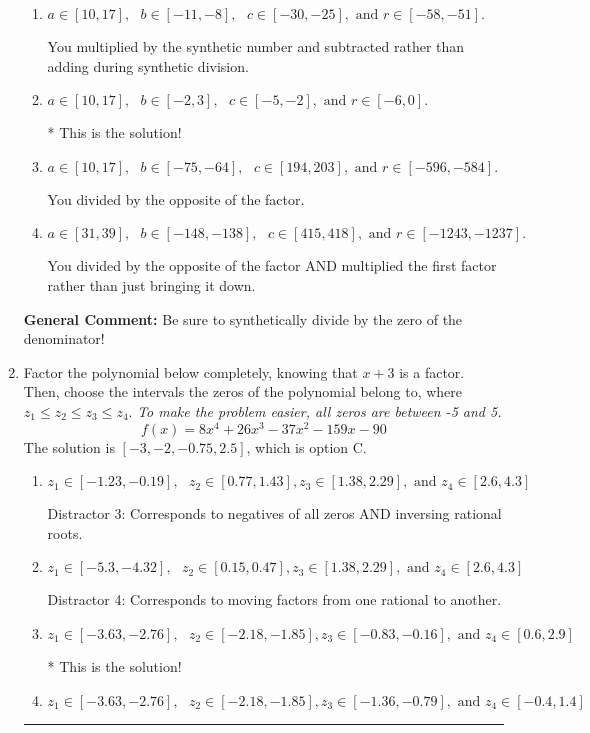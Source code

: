\documentclass{extbook}[14pt]
\newcommand{\litem}[1]{\item #1

\rule{\textwidth}{0.4pt}}
\begin{document}
\begin{enumerate}
{\begin{enumerate}[label=\Alph*.]
 You multiplied by the synthetic number rather than bringing the first factor down.
\item \( a \in [10, 17], \text{   } b \in [-11, -8], \text{   } c \in [-30, -25], \text{   and   } r \in [-58, -51]. \)

 You multiplied by the synthetic number and subtracted rather than adding during synthetic division.
\item \( a \in [10, 17], \text{   } b \in [-2, 3], \text{   } c \in [-5, -2], \text{   and   } r \in [-6, 0]. \)

* This is the solution!
\item \( a \in [10, 17], \text{   } b \in [-75, -64], \text{   } c \in [194, 203], \text{   and   } r \in [-596, -584]. \)

 You divided by the opposite of the factor.
\item \( a \in [31, 39], \text{   } b \in [-148, -138], \text{   } c \in [415, 418], \text{   and   } r \in [-1243, -1237]. \)

 You divided by the opposite of the factor AND multiplied the first factor rather than just bringing it down.
\end{enumerate}

\textbf{General Comment:} Be sure to synthetically divide by the zero of the denominator!
}
\litem{
Factor the polynomial below completely, knowing that $x + 3$ is a factor. Then, choose the intervals the zeros of the polynomial belong to, where $z_1 \leq z_2 \leq z_3 \leq z_4$. \textit{To make the problem easier, all zeros are between -5 and 5.}
\[ f(x) = 8x^{4} +26 x^{3} -37 x^{2} -159 x -90 \]The solution is \( [-3, -2, -0.75, 2.5] \), which is option C.\begin{enumerate}[label=\Alph*.]
\item \( z_1 \in [-1.23, -0.19], \text{   }  z_2 \in [0.77, 1.43], z_3 \in [1.38, 2.29], \text{   and   } z_4 \in [2.6, 4.3] \)

 Distractor 3: Corresponds to negatives of all zeros AND inversing rational roots.
\item \( z_1 \in [-5.3, -4.32], \text{   }  z_2 \in [0.15, 0.47], z_3 \in [1.38, 2.29], \text{   and   } z_4 \in [2.6, 4.3] \)

 Distractor 4: Corresponds to moving factors from one rational to another.
\item \( z_1 \in [-3.63, -2.76], \text{   }  z_2 \in [-2.18, -1.85], z_3 \in [-0.83, -0.16], \text{   and   } z_4 \in [0.6, 2.9] \)

* This is the solution!
\item \( z_1 \in [-3.63, -2.76], \text{   }  z_2 \in [-2.18, -1.85], z_3 \in [-1.36, -0.79], \text{   and   } z_4 \in [-0.4, 1.4] \)


\end{enumerate}}
\end{enumerate}
\end{document}

